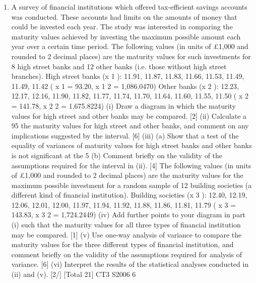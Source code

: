 \documentclass[a4paper,12pt]{article}
\begin{document}
\begin{enumerate}
\item 
A survey of financial institutions which offered tax-efficient savings accounts was
conducted. These accounts had limits on the amounts of money that could be
invested each year. The study was interested in comparing the maturity values
achieved by investing the maximum possible amount each year over a certain time
period.
The following values (in units of £1,000 and rounded to 2 decimal places) are the
maturity values for such investments for 8 high street banks and 12 other banks (i.e.
those without high street branches).
High street banks (x 1 ): 11.91, 11.87, 11.83, 11.66, 11.53, 11.49, 11.49, 11.42
( x 1 = 93.20, x 1 2 = 1,086.0470)
Other banks (x 2 ): 12.23, 12.17, 12.16, 11.90, 11.82, 11.77, 11.74, 11.70, 11.64, 11.60,
11.55, 11.50
( x 2 = 141.78, x 2 2 = 1,675.8224)
(i) Draw a diagram in which the maturity values for high street and other banks
may be compared.
[2]
(ii) Calculate a 95%
the maturity values for high street and other banks, and comment on any
implications suggested by the interval.
[6]
(iii) (a)
Show that a test of the equality of variances of maturity values for high
street banks and other banks is not significant at the 5%
(b)
Comment briefly on the validity of the assumptions required for the
interval in (ii).
[4]
The following values (in units of £1,000 and rounded to 2 decimal places) are the
maturity values for the maximum possible investment for a random sample of 12
building societies (a different kind of financial institution).
Building societies (x 3 ): 12.40, 12.19, 12.06, 12.01, 12.00, 11.97, 11.94, 11.92, 11.88,
11.86, 11.81, 11.79
( x 3 = 143.83, x 3 2 = 1,724.2449)
(iv) Add further points to your diagram in part (i) such that the maturity values for
all three types of financial institution may be compared.
[1]
(v) Use one-way analysis of variance to compare the maturity values for the three
different types of financial institution, and comment briefly on the validity of
the assumptions required for analysis of variance.
[6]
(vi) Interpret the results of the statistical analyses conducted in (ii) and (v).
[2/]
[Total 21]
CT3 S2006
6


\end{enumerate}
\end{document}

